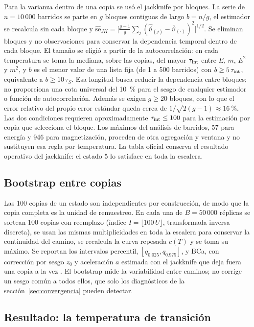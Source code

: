 Para la varianza dentro de una copia se usó el jackknife por bloques. La serie de $n=10\,000$ barridos se parte en $g$ bloques contiguos de largo $b=n/g$, el estimador se recalcula sin cada bloque y $\widehat{\mathrm{se}}_{JK}=\big[\tfrac{g-1}{g}\sum_j(\hat\vartheta_{(j)}-\bar\vartheta_{(\cdot)})^2\big]^{1/2}$. Se eliminan bloques y no observaciones para conservar la dependencia temporal dentro de cada bloque. El tamaño se eligió a partir de la autocorrelación: en cada temperatura se toma la mediana, sobre las copias, del mayor $\tau_{\mathrm{int}}$ entre $E$, $m$, $E^2$ y $m^2$, y $b$ es el menor valor de una lista fija (de 1 a 500 barridos) con $b\ge5\,\tau_{\mathrm{int}}$, equivalente a $b\ge10\,\tau_S$. Esa longitud busca reducir la dependencia entre bloques; no proporciona una cota universal del 10~\% para el sesgo de cualquier estimador o función de autocorrelación. Además se exigen $g\ge20$ bloques, con lo que el error relativo del propio error estándar queda cerca de $1/\sqrt{2(g-1)}\approx16~\%$. Las dos condiciones requieren aproximadamente $\tau_{\mathrm{int}}\le100$ para la estimación por copia que selecciona el bloque. Los máximos del análisis de barridos, 57 para energía y 946 para magnetización, proceden de otra agregación y ventana y no sustituyen esa regla por temperatura. La tabla oficial conserva el resultado operativo del jackknife: el estado 5 lo satisface en toda la escalera.

\subsection{Bootstrap entre copias}

Las 100 copias de un estado son independientes por construcción, de modo que la copia completa es la unidad de remuestreo. En cada una de $B=50\,000$ réplicas se sortean 100 copias con reemplazo (índice $I=\lfloor100\,U\rfloor$, transformada inversa discreta), se usan las mismas multiplicidades en toda la escalera para conservar la continuidad del camino, se recalcula la curva repesada $c(T)$ y se toma su máximo. Se reportan los intervalos percentil, $[q_{0.025},q_{0.975}]$, y BCa, con corrección por sesgo $z_0$ y aceleración $a$ estimada con el jackknife que deja fuera una copia a la vez \citep{efron1993}. El bootstrap mide la variabilidad entre caminos; no corrige un sesgo común a todos ellos, que solo los diagnósticos de la sección~\ref{sec:convergencia} pueden detectar.

\subsection{Resultado: la temperatura de transición}

